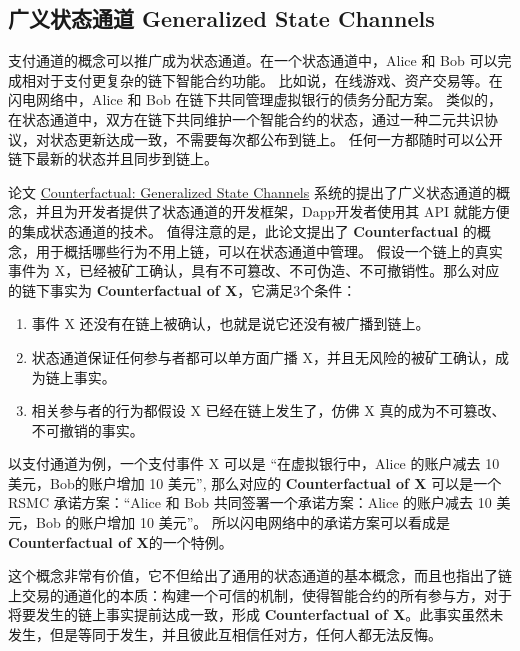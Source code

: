 \begin{appendices}
\subsection{广义状态通道 Generalized State Channels}
支付通道的概念可以推广成为状态通道。在一个状态通道中，Alice 和 Bob 可以完成相对于支付更复杂的链下智能合约功能。
比如说，在线游戏、资产交易等。在闪电网络中，Alice 和 Bob 在链下共同管理虚拟银行的债务分配方案。
类似的，在状态通道中，双方在链下共同维护一个智能合约的状态，通过一种二元共识协议，对状态更新达成一致，不需要每次都公布到链上。
任何一方都随时可以公开链下最新的状态并且同步到链上。

论文 \href{https://www.counterfactual.com/statechannels/}{Counterfactual: Generalized State Channels} 系统的提出了广义状态通道的概念，并且为开发者提供了状态通道的开发框架，Dapp开发者使用其 API 就能方便的集成状态通道的技术。
值得注意的是，此论文提出了 \textbf{Counterfactual} 的概念，用于概括哪些行为不用上链，可以在状态通道中管理。
假设一个链上的真实事件为 X，已经被矿工确认，具有不可篡改、不可伪造、不可撤销性。那么对应的链下事实为 \textbf{Counterfactual of X}，它满足3个条件：

\begin{enumerate}
    \item 事件 X 还没有在链上被确认，也就是说它还没有被广播到链上。
    \item 状态通道保证任何参与者都可以单方面广播 X，并且无风险的被矿工确认，成为链上事实。
    \item 相关参与者的行为都假设 X 已经在链上发生了，仿佛 X 真的成为不可篡改、不可撤销的事实。
\end{enumerate}

以支付通道为例，一个支付事件 X 可以是 “在虚拟银行中，Alice 的账户减去 10 美元，Bob的账户增加 10 美元”, 那么对应的 \textbf{Counterfactual of X} 可以是一个 RSMC 承诺方案：“Alice 和 Bob 共同签署一个承诺方案：Alice 的账户减去 10 美元，Bob 的账户增加 10 美元”。
所以闪电网络中的承诺方案可以看成是\textbf{Counterfactual of X}的一个特例。

这个概念非常有价值，它不但给出了通用的状态通道的基本概念，而且也指出了链上交易的通道化的本质：构建一个可信的机制，使得智能合约的所有参与方，对于将要发生的链上事实提前达成一致，形成 \textbf{Counterfactual of X}。此事实虽然未发生，但是等同于发生，并且彼此互相信任对方，任何人都无法反悔。

\end{appendices}
